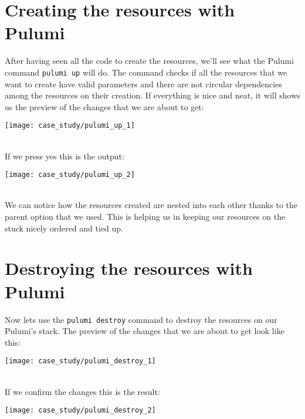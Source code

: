 \section{Creating the resources with Pulumi}
After having seen all the code to create the resources, we'll see what the Pulumi command \texttt{pulumi up} will do.
The command checks if all the resources that we want to create have valid parameters and there are not circular dependencies among the resources on their creation.
If everything is nice and neat, it will shows us the preview of the changes that we are about to get:
\begin{center}
  \texttt{[image: case\_study/pulumi\_up\_1]} 
\end{center}\mbox{}\\

If we press yes this is the output:
\begin{center}
  \texttt{[image: case\_study/pulumi\_up\_2]} 
\end{center}\mbox{}\\
We can notice how the resources created are nested into each other thanks to the parent option that we used.
This is helping us in keeping our resources on the stuck nicely ordered and tied up.\\

\section{Destroying the resources with Pulumi}
Now lets use the \texttt{pulumi destroy} command to destroy the resources on our Pulumi's stack.
The preview of the changes that we are about to get look like this:
\begin{center}
  \texttt{[image: case\_study/pulumi\_destroy\_1]} 
\end{center}\mbox{}\\

If we confirm the changes this is the result:
\begin{center}
  \texttt{[image: case\_study/pulumi\_destroy\_2]} 
\end{center}\mbox{}\\


